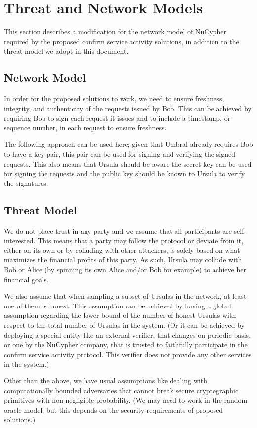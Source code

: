 \section{Threat and Network Models}
\label{threat-network-model}
This section describes a modification for the network model of NuCypher 
required by the proposed confirm service activity solutions, in 
addition to the threat model we adopt in this document.


\subsection{Network Model}
In order for the proposed solutions to work, we need to ensure freshness, 
integrity, and authenticity of the requests issued by Bob. This can be achieved 
by requiring Bob to sign each request it issues and to include a timestamp, or 
sequence number, in each request to ensure freshness.


The following approach can be used here; given that Umbral already requires Bob to 
have a key pair, this pair can be used for signing and verifying the signed requests. 
This also means that Ursula should be aware the secret key can be used for 
signing the requests and the public 
key should be known to Ursula to verify the signatures. 


\subsection{Threat Model}
We do not place trust in any party and we assume that all participants are 
self-interested. This means that a party may 
follow the protocol or deviate from it, either on its own or by colluding 
with other attackers, is solely based on what maximizes the financial profits 
of this party. As such, Ursula may collude with Bob or Alice (by spinning 
its own Alice and/or Bob for example) to achieve her financial goals. 


We also assume that when sampling a subset of Ursulas in the network, 
at least one of them is honest. This assumption can be achieved by 
having a global assumption regarding the lower bound of the number of 
honest Ursulas with respect to the total number of Ursulas in the system. 
(Or it can be achieved by deploying a special entity like an external verifier, 
that changes on periodic basis, or one by the NuCypher company, that is 
trusted to faithfully participate in the confirm 
service activity protocol. This verifier does not provide any other services 
in the system.)


Other than the above, we have usual assumptions like dealing with 
computationally bounded adversaries 
that cannot break secure cryptographic primitives with non-negligible probability. 
(We may need to work in the random oracle model, but this depends on the 
security requirements of proposed solutions.)
